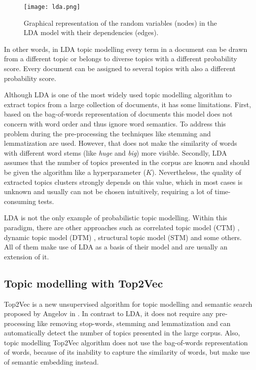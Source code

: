 \documentclass[fontsize=12pt,a4paper,twoside,openany]{scrbook}
\begin{document}
\begin{figure}[h]
\centering
\texttt{[image: lda.png]}
\caption{Graphical representation of the random variables (nodes) in the LDA model with their dependencies (edges).}
\label{fig:lda}
\end{figure}

In other words, in LDA topic modelling every term in a document can be drawn from a different topic or belongs to diverse topics with a different probability score. Every document can be assigned to several topics with also a different probability score.

Although LDA is one of the most widely used topic modelling algorithm to extract topics from a large collection of documents, it has some limitations. First, based on the bag-of-words representation of documents this model does not concern with word order and thus ignore word semantics. To address this problem during the pre-processing the techniques like stemming and lemmatization are used. However, that does not make the similarity of words with different word stems (like \emph{huge} and \emph{big}) more visible. Secondly, LDA assumes that the number of topics presented in the corpus are known and should be given the algorithm like a hyperparameter (\(K\)). Nevertheless, the quality of extracted topics clusters strongly depends on this value, which in most cases is unknown and usually can not be chosen intuitively, requiring a lot of time-consuming tests. 

LDA is not the only example of probabilistic topic modelling. Within this paradigm, there are other approaches  such as correlated topic model (CTM) \parencite{Blei05}, dynamic topic model (DTM) \parencite{Blei06}, structural topic model (STM) \parencite{Roberts13} and some others. All of them make use of LDA as a basis of their model and are usually an extension of it.

\subsection{Topic modelling with Top2Vec}
\label{sec:Top2Vec}

Top2Vec is a new unsupervised algorithm for topic modelling and semantic search proposed by Angelov in \cite*{Angelov20}. In contrast to LDA, it does not require any pre-processing like removing stop-words, stemming and lemmatization and can automatically detect the number of topics presented in the large corpus. Also, topic modelling Top2Vec algorithm does not use the bag-of-words representation of words, because of its inability to capture the similarity of words, but make use of semantic embedding instead.
\end{document}
